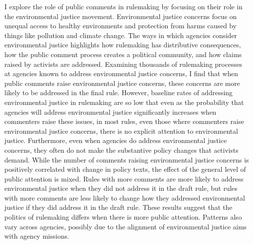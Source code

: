 I explore the role of public comments in rulemaking by focusing on their role in the environmental justice movement. Environmental justice concerns focus on unequal access to healthy environments and protection from harms caused by things like pollution and climate change. The ways in which agencies consider environmental justice highlights how rulemaking has distributive consequences, how the public comment process creates a political community, and how claims raised by activists are addressed. Examining thousands of rulemaking processes at agencies known to address environmental justice concerns, I find that when public comments raise environmental justice concerns, these concerns are more likely to be addressed in the final rule. However, baseline rates of addressing environmental justice in rulemaking are so low that even as the probability that agencies will address environmental justice significantly increases when commenters raise these issues, in most rules, even those where commenters raise environmental justice concerns, there is no explicit attention to environmental justice. Furthermore, even when agencies do address environmental justice concerns, they often do not make the substantive policy changes that activists demand.
While the number of comments raising environmental justice concerns is positively correlated with change in policy texts, the effect of the general level of public attention is mixed. Rules with more comments are more likely to address environmental justice when they did not address it in the draft rule, but rules with more comments are less likely to change how they addressed environmental justice if they did address it in the draft rule. These results suggest that the politics of rulemaking differs when there is more public attention. Patterns also vary across agencies, possibly due to the alignment of environmental justice aims with agency missions. 
